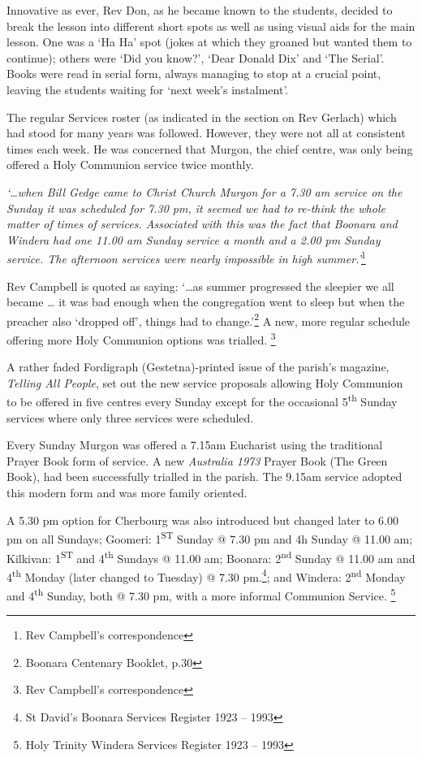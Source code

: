 Innovative as ever, Rev Don, as he became known to the students, decided to break the lesson into different short spots as well as using visual aids for the main lesson. One was a `Ha Ha' spot (jokes at which they groaned but wanted them to continue); others were `Did you know?', `Dear Donald Dix' and `The Serial'. Books were read in serial form, always managing to stop at a crucial point, leaving the students waiting for `next week's instalment'.



The regular Services roster (as indicated in the section on Rev Gerlach) which had stood for many years was followed. However, they were not all at consistent times each week. He was concerned that Murgon, the chief centre, was only being offered a Holy Communion service twice monthly.



\emph{`\ldots when Bill Gedge came to Christ Church Murgon for a 7.30 am service on the Sunday it was scheduled for 7.30 pm, it seemed we had to re-think the whole matter of times of services. Associated with this was the fact that Boonara and Windera had one 11.00 am Sunday service a month and a 2.00 pm Sunday service. The afternoon services were nearly impossible in high summer.'}\footnote{Rev Campbell's correspondence}


Rev Campbell is quoted as saying: `\ldots as summer progressed the sleepier we all became \ldots{} it was bad enough when the congregation went to sleep but when the preacher also `dropped off', things had to change.'\footnote{Boonara Centenary Booklet, p.30} A new, more regular schedule offering more Holy Communion options was trialled. \footnote{Rev Campbell's correspondence}


A rather faded Fordigraph (Gestetna)-printed issue of the parish's magazine, \emph{Telling All People}, set out the new service proposals allowing Holy Communion to be offered in five centres every Sunday except for the occasional 5\textsuperscript{th} Sunday services where only three services were scheduled.



Every Sunday Murgon was offered a 7.15am Eucharist using the traditional Prayer Book form of service. A new \emph{Australia 1973} Prayer Book (The Green Book), had been successfully trialled in the parish. The 9.15am service adopted this modern form and was more family oriented.



A 5.30 pm option for Cherbourg was also introduced but changed later to 6.00 pm on all Sundays; Goomeri: 1\textsuperscript{ST} Sunday @ 7.30 pm and 4h Sunday @ 11.00 am; Kilkivan: 1\textsuperscript{ST} and 4\textsuperscript{th} Sundays @ 11.00 am; Boonara: 2\textsuperscript{nd} Sunday @ 11.00 am and 4\textsuperscript{th} Monday (later changed to Tuesday) @ 7.30 pm.\footnote{St David's Boonara Services Register 1923 -- 1993}; and Windera: 2\textsuperscript{nd} Monday and 4\textsuperscript{th} Sunday, both @ 7.30 pm, with a more informal Communion Service. \footnote{Holy Trinity Windera Services Register 1923 -- 1993}


